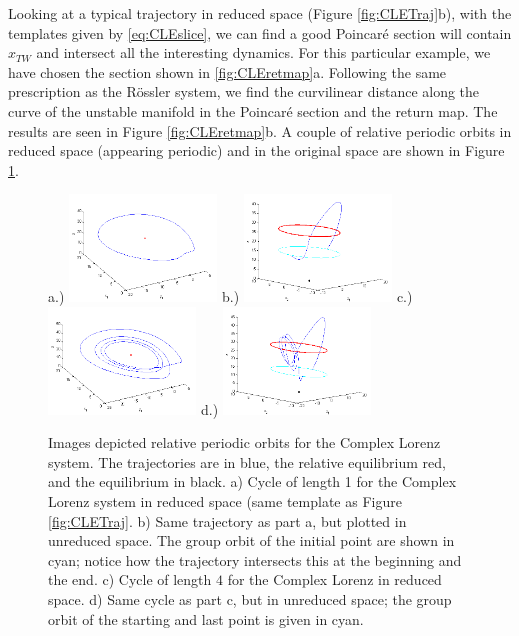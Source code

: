 \documentclass[aip,cha,reprint,
secnumarabic,
nofootinbib, tightenlines,
nobibnotes, showkeys, showpacs,
groupedaddress
]{revtex4-1}
\begin{document}
Looking at a typical trajectory in reduced space (Figure \ref{fig:CLETraj}b), with the templates given by \ref{eq:CLEslice}, we can find a good Poincar\'e section will contain $x_{TW}$ and intersect all the interesting dynamics. For this particular example, we have chosen the section shown in \ref{fig:CLEretmap}a.  Following the same prescription as the R\"ossler system, we find the curvilinear distance along the curve of the unstable manifold in the Poincar\'e section and the return map.  The results are seen in Figure \ref{fig:CLEretmap}b.  A couple of relative periodic orbits in reduced space (appearing periodic) and in the original space are shown in Figure \ref{fig:CLEPO}.
 \begin{figure}
\centering
a.)  \includegraphics[width=0.35\textwidth]{Figs/Section3/kc1cyclec.png}
b.)
  \includegraphics[width=0.35\textwidth]{Figs/Section3/kc1cycleunredc.png}
c.)
  \includegraphics[width=0.35\textwidth]{Figs/Section3/kc4cyclec.png}
d.)
  \includegraphics[width=0.35\textwidth]{Figs/Section3/kc4cyclewithcirclec.png}
\caption{Images depicted relative periodic orbits for the Complex Lorenz system.  The trajectories are in blue, the relative equilibrium red, and the equilibrium in black.
a) Cycle of length 1 for the Complex Lorenz system in reduced space (same template as Figure \ref{fig:CLETraj}. b) Same trajectory as part a, but plotted in unreduced space.  The group orbit of the initial point are shown in cyan; notice how the trajectory intersects this at the beginning and the end. c) Cycle of length $4$ for the Complex Lorenz in reduced space. d) Same cycle as part c, but in unreduced space; the group orbit of the starting and last point is given in cyan. }
 \label{fig:CLEPO}
\end{figure}
\end{document}
